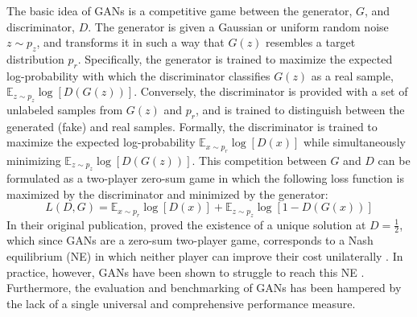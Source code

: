 \label{sec:gans}
The basic idea of GANs is a competitive game between the generator, $G$, and discriminator, $D$. The generator is given a Gaussian or uniform random noise $z \sim p_{z}$, and transforms it in such a way that $G(z)$ resembles a target distribution $p_{r}$. Specifically, the generator is trained to maximize the expected log-probability with which the discriminator classifies $G(z)$ as a real sample, $\mathbb{E}_{z \sim p_{z}}\log[D(G(z))]$. Conversely, the discriminator is provided with a set of unlabeled samples from $G(z)$ and $p_{r}$, and is trained to distinguish between the generated (fake) and real samples. Formally, the discriminator is trained to maximize the expected log-probability $\mathbb{E}_{x \sim p_{r}}\log[D(x)]$ while simultaneously minimizing $\mathbb{E}_{z \sim p_{z}}\log[D(G(z))]$. This competition between $G$ and $D$ can be formulated as a two-player zero-sum game in which the following loss function is maximized by the discriminator and minimized by the generator:
\begin{equation}
L(D,G) = \mathbb{E}_{x\sim p_{r}}\log[D(x)] + \mathbb{E}_{z \sim p_{z}}\log[1-D(G(x))]
\end{equation}
In their original publication,  proved the existence of a unique solution at $D=\frac{1}{2}$, which since GANs are a zero-sum two-player game, corresponds to a Nash equilibrium (NE) in which neither player can improve their cost unilaterally . In practice, however, GANs have been shown to struggle to reach this NE . Furthermore, the evaluation and benchmarking of GANs has been hampered by the lack of a single universal and comprehensive performance measure.

